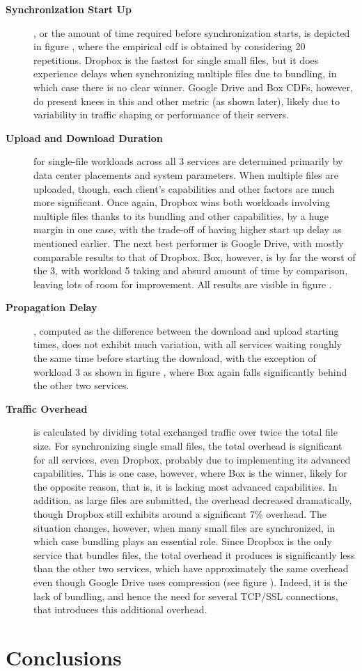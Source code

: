 \begin{description}
	\item[\textbf{Synchronization Start Up}], or the amount of time required before synchronization starts, is depicted in figure , where the empirical \ac{cdf} is obtained by considering 20 repetitions. Dropbox is the fastest for single small files, but it does experience delays when synchronizing multiple files due to bundling, in which case there is no clear winner. Google Drive and Box CDFs, however, do present knees in this and other metric (as shown later), likely due to variability in traffic shaping or performance of their servers.
	
	\item[\textbf{Upload and Download Duration}] for single-file workloads across all 3 services are determined primarily by data center placements and system parameters. When multiple files are uploaded, though, each client's capabilities and other factors are much more significant. Once again, Dropbox wins both workloads involving multiple files thanks to its bundling and other capabilities, by a huge margin in one case, with the trade-off of having higher start up delay as mentioned earlier. The next best performer is Google Drive, with mostly comparable results to that of Dropbox. Box, however, is by far the worst of the 3, with workload 5 taking and absurd amount of time by comparison, leaving lots of room for improvement. All results are visible in figure  . 
	
	\item[\textbf{Propagation Delay}], computed as the difference between the download and upload starting times,  does not exhibit much variation, with all services waiting roughly the same time before starting the download, with the exception of workload 3 as shown in figure , where Box again falls significantly behind the other two services. 
	
	\item[\textbf{Traffic Overhead}] is calculated by dividing total exchanged traffic over twice the total file size. For synchronizing single small files, the total overhead is significant for all services, even Dropbox, probably due to implementing its advanced capabilities. This is one case, however, where Box is the winner, likely for the opposite reason, that is, it is lacking most advanced capabilities. In addition, as large files are submitted, the overhead decreased dramatically, though Dropbox still exhibits around a significant 7\% overhead. The situation changes, however, when many small files are synchronized, in which case bundling plays an essential role. Since Dropbox is the only service that bundles files, the total overhead it produces is significantly less than the other two services, which have approximately the same overhead even though Google Drive uses compression (see figure ). Indeed, it is the lack of bundling, and hence the need for several TCP/SSL connections, that introduces this additional overhead.
\end{description}


\section{Conclusions} 
